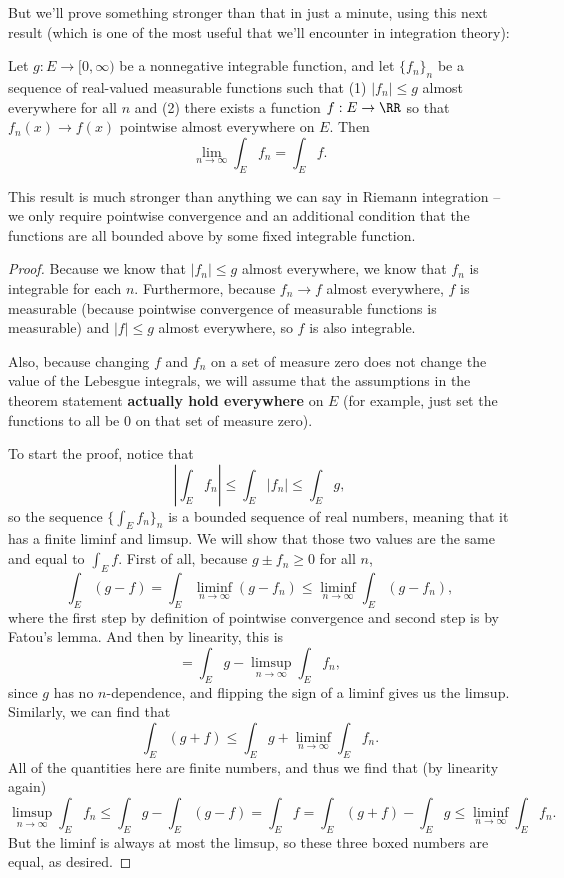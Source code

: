 But we'll prove something stronger than that in just a minute, using this next result (which is one of the most useful that we'll encounter in integration theory):

\begin{theorem}
Let $g: E \to [0, \infty)$ be a nonnegative integrable function, and let $\{f_n\}_n$ be a sequence of real-valued measurable functions such that (1) $|f_n| \le g$ almost everywhere for all $n$ and (2) there exists a function $f: E \to \RR$ so that $f_n(x) \to f(x)$ pointwise almost everywhere on $E$. Then 
\[
    \lim_{n \to \infty} \int_E f_n = \int_E f. 
\]
\end{theorem}

This result is much stronger than anything we can say in Riemann integration -- we only require pointwise convergence and an additional condition that the functions are all bounded above by some fixed integrable function.

\begin{proof}
Because we know that $|f_n| \le g$ almost everywhere, we know that $f_n$ is integrable for each $n$. Furthermore, because $f_n \to f$ almost everywhere, $f$ is measurable (because pointwise convergence of measurable functions is measurable) and $|f| \le g$ almost everywhere, so $f$ is also integrable. 

Also, because changing $f$ and $f_n$ on a set of measure zero does not change the value of the Lebesgue integrals, we will assume that the assumptions in the theorem statement \textbf{actually hold everywhere} on $E$ (for example, just set the functions to all be $0$ on that set of measure zero).

To start the proof, notice that 
\[
    \left|\int_E f_n\right| \le \int_E |f_n| \le \int_E g,
\]
so the sequence $\{\int_E f_n\}_n$ is a bounded sequence of real numbers, meaning that it has a finite liminf and limsup. We will show that those two values are the same and equal to $\int_E f$. First of all, because $g \pm f_n \ge 0$ for all $n$, 
\[
    \int_E (g-f) = \int_E \liminf_{n \to \infty} (g-f_n) \le \liminf_{n \to \infty} \int_E (g - f_n),
\]
where the first step by definition of pointwise convergence and second step is by Fatou's lemma. And then by linearity, this is 
\[
    = \int_E g - \limsup_{n \to \infty} \int_E f_n,
\]
since $g$ has no $n$-dependence, and flipping the sign of a liminf gives us the limsup. Similarly, we can find that 
\[
    \int_E (g+f) \le \int_E g + \liminf_{n \to \infty} \int_E f_n.
\]
All of the quantities here are finite numbers, and thus we find that (by linearity again)
\[
    \boxed{\limsup_{n \to \infty} \int_E f_n }\le \int_E g - \int_E (g-f) = \boxed{\int_E f}= \int_E (g+f) - \int_E g \le \boxed{\liminf_{n \to \infty} \int_E f_n}.
\]
But the liminf is always at most the limsup, so these three boxed numbers are equal, as desired.
\end{proof}

